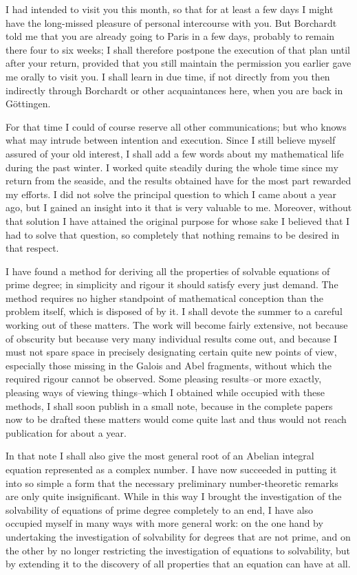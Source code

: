 \documentclass[11pt]{article}
\begin{document}
I had intended to visit you this month, so that for at least a few days I might have the long-missed pleasure of personal intercourse with you. But Borchardt told me that you are already going to Paris in a few days, probably to remain there four to six weeks; I shall therefore postpone the execution of that plan until after your return, provided that you still maintain the permission you earlier gave me orally to visit you. I shall learn in due time, if not directly from you then indirectly through Borchardt or other acquaintances here, when you are back in Göttingen.

For that time I could of course reserve all other communications; but who knows what may intrude between intention and execution. Since I still believe myself assured of your old interest, I shall add a few words about my mathematical life during the past winter. I worked quite steadily during the whole time since my return from the seaside, and the results obtained have for the most part rewarded my efforts. I did not solve the principal question to which I came about a year ago, but I gained an insight into it that is very valuable to me. Moreover, without that solution I have attained the original purpose for whose sake I believed that I had to solve that question, so completely that nothing remains to be desired in that respect.

I have found a method for deriving all the properties of solvable equations of prime degree; in simplicity and rigour it should satisfy every just demand. The method requires no higher standpoint of mathematical conception than the problem itself, which is disposed of by it. I shall devote the summer to a careful working out of these matters. The work will become fairly extensive, not because of obscurity but because very many individual results come out, and because I must not spare space in precisely designating certain quite new points of view, especially those missing in the Galois and Abel fragments, without which the required rigour cannot be observed. Some pleasing results--or more exactly, pleasing ways of viewing things--which I obtained while occupied with these methods, I shall soon publish in a small note, because in the complete papers now to be drafted these matters would come quite last and thus would not reach publication for about a year.

In that note I shall also give the most general root of an Abelian integral equation represented as a complex number. I have now succeeded in putting it into so simple a form that the necessary preliminary number-theoretic remarks are only quite insignificant. While in this way I brought the investigation of the solvability of equations of prime degree completely to an end, I have also occupied myself in many ways with more general work: on the one hand by undertaking the investigation of solvability for degrees that are not prime, and on the other by no longer restricting the investigation of equations to solvability, but by extending it to the discovery of all properties that an equation can have at all.
\end{document}
